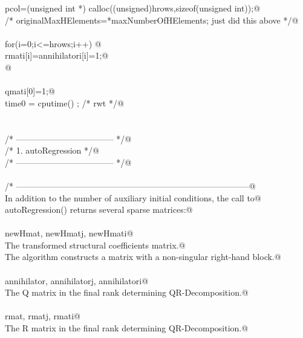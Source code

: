 \documentclass[12pt]{article}
\begin{document}
\begin{flushleft}
\begin{minipage}{\linewidth}
\begin{list}{}{}
\mbox{}\verb@        pcol=(unsigned int *) calloc((unsigned)hrows,sizeof(unsigned int));@\\
\mbox{}\verb@        /* originalMaxHElements=*maxNumberOfHElements; just did this above */@\\
\mbox{}\verb@@\\
\mbox{}\verb@        for(i=0;i<=hrows;i++) {@\\
\mbox{}\verb@                rmati[i]=annihilatori[i]=1;@\\
\mbox{}\verb@        }@\\
\mbox{}\verb@@\\
\mbox{}\verb@        qmati[0]=1;@\\
\mbox{}\verb@        time0 = cputime() ; /* rwt */@\\
\mbox{}\verb@@\\
\mbox{}\verb@@\\
\mbox{}\verb@        /* ----------------------------------- */@\\
\mbox{}\verb@        /* 1. autoRegression                   */@\\
\mbox{}\verb@        /* ----------------------------------- */@\\
\mbox{}\verb@@\\
\mbox{}\verb@        /* -----------------------------------------------------------------------------------@\\
\mbox{}\verb@        In addition to the number of auxiliary initial conditions, the call to@\\
\mbox{}\verb@        autoRegression() returns several sparse matrices:@\\
\mbox{}\verb@@\\
\mbox{}\verb@                newHmat, newHmatj, newHmati@\\
\mbox{}\verb@                        The transformed structural coefficients matrix.@\\
\mbox{}\verb@                        The algorithm constructs a matrix with a non-singular right-hand block.@\\
\mbox{}\verb@@\\
\mbox{}\verb@                annihilator, annihilatorj, annihilatori@\\
\mbox{}\verb@                        The Q matrix in the final rank determining QR-Decomposition.@\\
\mbox{}\verb@@\\
\mbox{}\verb@                rmat, rmatj, rmati@\\
\mbox{}\verb@                                The R matrix in the final rank determining QR-Decomposition.@\\

\end{list}
\end{minipage}
\end{flushleft}
\end{document}
